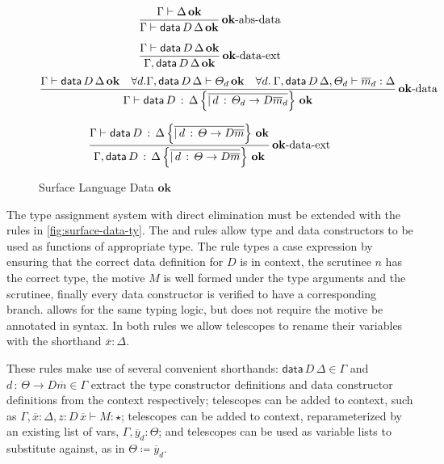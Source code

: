 \begin{figure}
\[
\frac{\Gamma\vdash\Delta\,\mathbf{ok}}{\Gamma\vdash\mathsf{data}\,D\,\Delta\,\mathbf{ok}}\operatorname{\mathbf{ok}-abs-data}
\]

\[
\frac{\Gamma\vdash\mathsf{data}\,D\,\Delta\,\mathbf{ok}}{\Gamma,\mathsf{data}\,D\,\Delta\,\mathbf{ok}}\operatorname{\mathbf{ok}-data-ext}
\]
\[
\frac{\Gamma\vdash\mathsf{data}\,D\,\Delta\,\mathbf{ok}\quad\forall d.\Gamma,\mathsf{data}\,D\,\Delta\vdash\varTheta_{d}\,\mathbf{ok}\quad\forall d.\:\Gamma,\mathsf{data}\,D\,\Delta,\varTheta_{d}\vdash\overline{m}_{d}:\Delta}{\Gamma\vdash\mathsf{data}\,D\,:\,\Delta\left\{ \overline{|\,d\,:\,\varTheta_{d}\rightarrow D\overline{m}_{d}}\right\} \,\mathbf{ok}}\operatorname{\mathbf{ok}-data}
\]

\[
\frac{\Gamma\vdash\mathsf{data}\,D\,:\,\Delta\left\{ \overline{|\,d\,:\,\varTheta\rightarrow D\overline{m}}\right\} \,\mathbf{ok}}{\Gamma,\mathsf{data}\,D\,:\,\Delta\left\{ \overline{|\,d\,:\,\varTheta\rightarrow D\overline{m}}\right\} \,\mathbf{ok}}\operatorname{\mathbf{ok}-data-ext}
\]

\caption{Surface Language Data $\mathbf{ok}$}
\label{fig:surface-data-ok}
\end{figure}

The type assignment system with direct elimination must be extended with the rules in \ref{fig:surface-data-ty}.
The  and  rules allow type and data constructors to be used as functions of appropriate type.
The  rule types a case expression by ensuring that the correct data definition for $D$ is in context, the scrutinee $n$ has the correct type, the motive $M$ is well formed under the type arguments and the scrutinee, %
  finally every data constructor is verified to have a corresponding branch.
 allows for the same typing logic, but does not require the motive be annotated in syntax.
In both rules we allow telescopes to rename their variables with the shorthand $\overline{x}:\Delta$.

These rules make use of several convenient shorthands:
  $\mathsf{data}\,D\,\Delta\in\Gamma$ and $d\,:\,\varTheta\rightarrow D\overline{m}\in\Gamma$ extract the type constructor definitions and data constructor definitions from the context respectively;
  telescopes can be added to context, such as $\Gamma,\overline{x}:\Delta,z:D\,\overline{x}\vdash M:\star$;
  telescopes can be added to context, reparameterized by an existing list of vars, $\Gamma,\overline{y}_{d}:\varTheta$;
  and telescopes can be used as variable lists to substitute against, as in $\varTheta\coloneqq\overline{y}_{d}$.

